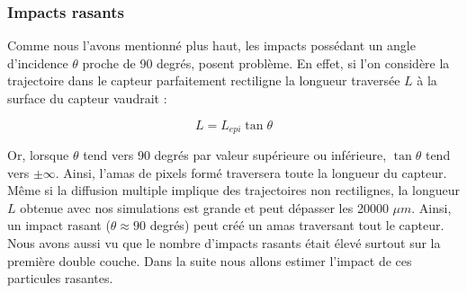 %   
%   
%   
% 
%   
  
  \subsubsection{Impacts rasants}
  
  Comme nous l'avons mentionn\'e plus haut, les impacts poss\'edant un angle d'incidence $\theta$ proche de 90 degr\'es, posent probl\`eme. En effet, si l'on consid\`ere la trajectoire dans le capteur parfaitement rectiligne la longueur travers\'ee $L$ \`a la surface du capteur vaudrait : 
  
  \begin{equation}
   L = L_{epi} \tan{\theta}
  \end{equation}
  
  Or, lorsque $\theta$ tend vers 90 degr\'es par valeur sup\'erieure ou inf\'erieure, $\tan{\theta}$ tend vers $\pm \infty$. Ainsi, l'amas de pixels form\'e traversera toute la longueur du capteur. M\^eme si la diffusion multiple implique des trajectoires non rectilignes, la longueur $L$ obtenue avec nos simulations est grande et peut dépasser les 20000 $\mu m$. Ainsi, un impact rasant ($\theta \approx 90$ degr\'es) peut cr\'e\'e un amas traversant tout le capteur. Nous avons aussi vu que le nombre d'impacts rasants \'etait \'elev\'e surtout sur la premi\`ere double couche. Dans la suite nous allons estimer l'impact de ces particules rasantes. 
 
